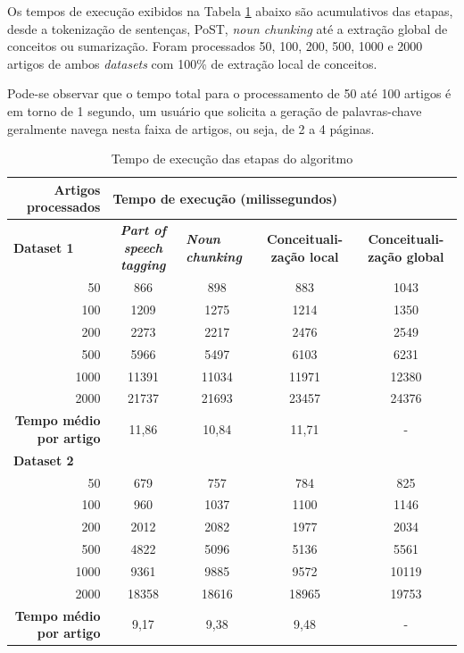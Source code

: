 Os tempos de execução exibidos na Tabela \ref{tab:temposExecucaoBSR} abaixo são acumulativos das etapas, desde a tokenização de sentenças, PoST, \emph{noun chunking} até a extração global de conceitos ou sumarização. Foram processados 50, 100, 200, 500, 1000 e 2000 artigos de ambos \emph{datasets} com 100\% de extração local de conceitos.

Pode-se observar que o tempo total para o processamento de 50 até 100 artigos é em torno de 1 segundo, um usuário que solicita a geração de palavras-chave geralmente navega nesta faixa de artigos, ou seja, de 2 a 4 páginas.

\begin{table}[htbp]
\center
\begin{tabular}{|r|c|c|c|c|c|}
\hline
\multicolumn{1}{|p{3cm}|}{\textbf{Artigos \mbox{processados}}} & \multicolumn{ 5}{l|}{\textbf{Tempo de execução (milissegundos)}} \\ \hline
\multicolumn{1}{|l|}{\textbf{Dataset 1}} & \multicolumn{1}{p{3cm}|}{\textbf{\textit{Part of speech tagging}}} & \multicolumn{1}{l|}{\textbf{\textit{Noun chunking}}} & \multicolumn{1}{p{3cm}|}{\textbf{Conceituali- zação local}} & \multicolumn{ 2}{p{3cm}|}{\textbf{Conceituali- zação global}} \\ \hline
50 & 866 & 898 & 883 & \multicolumn{ 2}{c|}{1043} \\ \hline
100 & 1209 & 1275 & 1214 & \multicolumn{ 2}{c|}{1350} \\ \hline
200 & 2273 & 2217 & 2476 & \multicolumn{ 2}{c|}{2549} \\ \hline
500 & 5966 & 5497 & 6103 & \multicolumn{ 2}{c|}{6231} \\ \hline
1000 & 11391 & 11034 & 11971 & \multicolumn{ 2}{c|}{12380} \\ \hline
2000 & 21737 & 21693 & 23457 & \multicolumn{ 2}{c|}{24376} \\ \hline
\multicolumn{1}{|p{3cm}|}{\textbf{Tempo médio por artigo}} & 11,86 & 10,84 & 11,71 & \multicolumn{ 2}{c|}{-} \\ \hline
\multicolumn{ 6}{|l|}{\textbf{Dataset 2}} \\ \hline
50 & 679 & 757 & 784 & \multicolumn{ 2}{c|}{825} \\ \hline
100 & 960 & 1037 & 1100 & \multicolumn{ 2}{c|}{1146} \\ \hline
200 & 2012 & 2082 & 1977 & \multicolumn{ 2}{c|}{2034} \\ \hline
500 & 4822 & 5096 & 5136 & \multicolumn{ 2}{c|}{5561} \\ \hline
1000 & 9361 & 9885 & 9572 & \multicolumn{ 2}{c|}{10119} \\ \hline
2000 & 18358 & 18616 & 18965 & \multicolumn{ 2}{c|}{19753} \\ \hline
\multicolumn{1}{|p{3cm}|}{\textbf{Tempo médio por artigo}} & 9,17 & 9,38 & 9,48 & \multicolumn{ 2}{c|}{-} \\ \hline
\end{tabular}
\caption{Tempo de execução das etapas do algoritmo}
\label{tab:temposExecucaoBSR}
\end{table}

